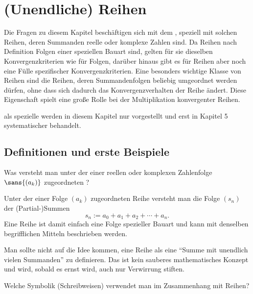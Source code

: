 \chapter{(Unendliche) Reihen}

Die Fragen zu diesem Kapitel beschäftigen sich mit dem 
, speziell mit solchen Reihen, 
deren Summanden reelle oder komplexe Zahlen sind. Da Reihen nach 
Definition Folgen einer speziellen Bauart sind, gelten für sie dieselben 
Konvergenzkriterien wie für Folgen, darüber hinaus gibt es für Reihen  
aber noch eine Fülle spezifischer Konvergenzkriterien. Eine besonders 
wichtige Klasse von Reihen sind die  Reihen, 
deren Summandenfolgen beliebig umgeordnet werden dürfen, ohne dass sich 
dadurch das Konvergenzverhalten der Reihe ändert. Diese 
Eigenschaft spielt eine große Rolle bei der Multiplikation konvergenter Reihen. 

 als spezielle  werden 
in diesem Kapitel nur vorgestellt und erst in Kapitel 5 
systematischer behandelt. 


\section{Definitionen und erste Beispiele}


\begin{frage}\label{02_rdef}
  Was versteht man unter der einer reellen oder komplexen Zahlenfolge 
  $\sans{(a_k)}$ zu\-ge\-ord\-ne\-ten ?
\end{frage}

\begin{antwort}
  Unter der einer Folge $(a_k)$ zugeordneten Reihe versteht man die Folge 
  $(s_n)$ der (Partial-)Summen
  \[
  s_n := a_0+ a_1+a_2+\cdots + a_n.
  \]
  Eine Reihe ist damit einfach eine Folge spezieller Bauart und kann mit 
  denselben begrifflichen Mitteln beschrieben werden. 

  Man sollte nicht auf die Idee kommen, eine Reihe als eine 
  "`Summe mit unendlich vielen Summanden"' zu definieren. 
  Das ist kein sauberes mathematisches Konzept und wird, 
  sobald es ernst wird, auch nur Verwirrung stiften. 
  \AntEnd
\end{antwort}

\begin{frage}\label{02_rsymb}
  Welche Symbolik (Schreibweisen) verwendet man im Zusammenhang mit Reihen?
\end{frage}

